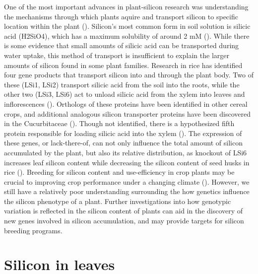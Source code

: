 \documentclass[12pt, letterpaper, ]{report}
\begin{document}
One of the most important advances in plant-silicon research was understanding the mechanisms through which plants aquire and transport silicon to specific location within the plant (\cite{coskun_controversies_2019}). Silicon’s most common form in soil solution is silicic acid (H2SiO4), which has a maximum solubility of around 2 mM (\cite{haynes_contemporary_2014}). While there is some evidence that small amounts of silicic acid can be transported during water uptake, this method of transport is insufficient to explain the larger amounts of silicon found in some plant families. Research in rice has identified four gene products that transport silicon into and through the plant body. Two of these (LSi1, LSi2) transport silicic acid from the soil into the roots, while the other two (LSi3, LSi6) act to unload silicic acid from the xylem into leaves and inflorescences (\cite{yamaji_orchestration_2015}). Orthologs of these proteins have been identified in other cereal crops, and additional analogous silicon transporter proteins have been discovered in the Cucurbitaceae (\cite{reynolds_silicon_2016}). Though not identified, there is a hypothesized fifth protein responsible for loading silicic acid into the xylem (\cite{farooq_silicon_2015}). The expression of these genes, or lack-there-of, can not only influence the total amount of silicon accumulated by the plant, but also its relative distribution, as knockout of LSi6 increases leaf silicon content while decreasing the silicon content of seed husks in rice (\cite{yamaji_transporter_2008}). Breeding for silicon content and use-efficiency in crop plants may be crucial to improving crop performance under a changing climate (\cite{christian_breeding_2022}). However, we still have a relatively poor understanding surrounding the how genetics influence the silicon phenotype of a plant. Further investigations into how genotypic variation is reflected in the silicon content of plants can aid in the discovery of new genes involved in silicon accumulation, and may provide targets for silicon breeding programs. 

\section{Silicon in leaves}	
\end{document}

